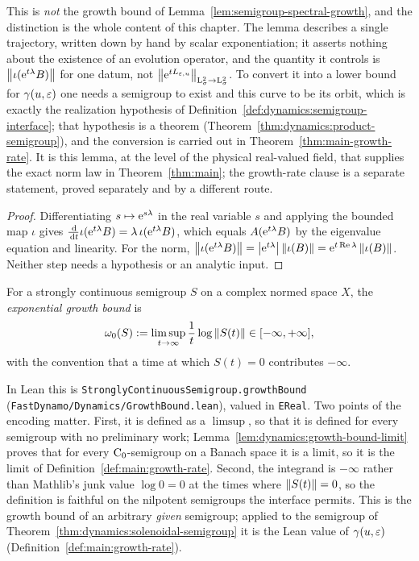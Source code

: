 This is \emph{not} the growth bound of Lemma~\ref{lem:semigroup-spectral-growth}, and the
distinction is the whole content of this chapter.  The lemma describes a single
trajectory, written down by hand by scalar exponentiation; it asserts nothing about the
existence of an evolution operator, and the quantity it controls is
$\left\|\iota(\mathrm{e}^{t\lambda}B)\right\| $ for one datum, not
$\left\|\mathrm{e}^{tL_{\varepsilon,u}}\right\|_{\mathrm{L}^2_\sigma\to\mathrm{L}^2_\sigma} $.  To convert it into a lower
bound for $\gamma(u,\varepsilon) $ one needs a semigroup to exist and this curve to be its orbit,
which is exactly the realization hypothesis of
Definition~\ref{def:dynamics:semigroup-interface}; that hypothesis is a theorem
(Theorem~\ref{thm:dynamics:product-semigroup}), and the conversion is carried out in
Theorem~\ref{thm:main-growth-rate}.  It is this lemma, at the level of the physical
real-valued field, that supplies the exact norm law in Theorem~\ref{thm:main}; the
growth-rate clause is a separate statement, proved separately and by a different route.

\begin{proof}
  \leanok
  Differentiating $s\mapsto\mathrm{e}^{s\lambda} $ in the real variable $s $ and applying the
  bounded map $\iota $ gives
  $\frac{\,\mathrm{d}}{\,\mathrm{d} t}\iota(\mathrm{e}^{t\lambda}B)=\lambda\,\iota(\mathrm{e}^{t\lambda}B)$, which equals
  $A(\mathrm{e}^{t\lambda}B) $ by the eigenvalue equation and linearity.  For the norm,
  $\left\|\iota(\mathrm{e}^{t\lambda}B)\right\|=\left\lvert\mathrm{e}^{t\lambda}\right\rvert\left\|\iota(B)\right\|=\mathrm{e}^{t\operatorname{Re}\lambda}\left\|\iota(B)\right\| $.
  Neither step needs a hypothesis or an analytic input.
\end{proof}

\begin{definition}
  \label{def:dynamics:growth-bound}
  \leanok
  For a strongly continuous semigroup $S $ on a complex normed space $X $, the
  \emph{exponential growth bound} is
  \[
    \omega_0(S)
    :=\limsup_{t\to\infty}\frac1t\log\left\|S(t)\right\|
    \in[-\infty,+\infty],
  \]
  with the convention that a time at which $S(t)=0 $ contributes $-\infty $.
\end{definition}

In Lean this is \texttt{StronglyContinuousSemigroup.growthBound}
(\texttt{FastDynamo/Dynamics/GrowthBound.lean}), valued in \texttt{EReal}.  Two points of
the encoding matter.  First, it is defined as a $\limsup $, so that it is defined for every
semigroup with no preliminary work; Lemma~\ref{lem:dynamics:growth-bound-limit} proves that
for every $\mathrm{C}_0$-semigroup on a Banach space it is a limit, so it is the limit of
Definition~\ref{def:main:growth-rate}.  Second, the integrand is $-\infty $ rather than
Mathlib's junk value $\log0=0 $ at the times where $\left\|S(t)\right\|=0 $, so the definition is
faithful on the nilpotent semigroups the interface permits.  This is the growth bound of an
arbitrary \emph{given} semigroup; applied to the semigroup of
Theorem~\ref{thm:dynamics:solenoidal-semigroup} it is the Lean value of $\gamma(u,\varepsilon) $
(Definition~\ref{def:main:growth-rate}).

